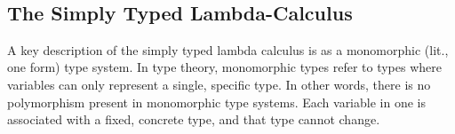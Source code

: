 \documentclass{l4proj}
\begin{document}








\

\subsection{The Simply Typed Lambda-Calculus}

A key description of the simply typed lambda calculus is as a monomorphic (lit., one form) type system.
In type theory, monomorphic types refer to types where variables can only represent a single, specific type.
In other words, there is no polymorphism present in monomorphic type systems. Each variable in one is associated with a fixed, concrete type, and that type cannot change.
\end{document}
